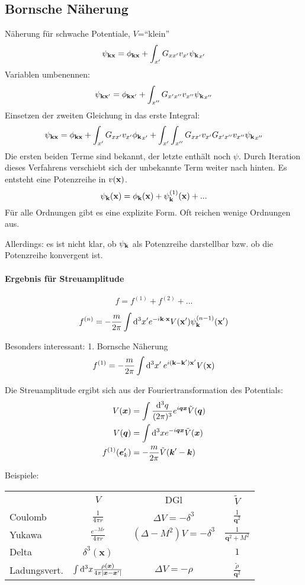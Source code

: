 \documentclass[11pt,a4paper]{report}
\renewcommand{\vec}{\boldsymbol}
\begin{document}
\subsection{Bornsche Näherung}

Näherung für schwache Potentiale, $V$=``klein''
$$\psi_{\mathbf{k} \mathbf{x} }=\phi_{\mathbf{k}\mathbf{x}}+\int_{x'}G_{xx'}v_{x'}{\psi_{\mathbf{k}}}_{x'}$$
Variablen umbenennen:
$$\psi_{\mathbf{k} \mathbf{x}' }=\phi_{\mathbf{k}\mathbf{x}'}+\int_{x''}G_{x'x''}v_{x''}{\psi_{\mathbf{k}}}_{x''}$$
Einsetzen der zweiten Gleichung in das erste Integral:
$$\psi_{\mathbf{k} \mathbf{x} }=\phi_{\mathbf{k}\mathbf{x}} + \int_{x'}G_{xx'}v_{x'}{\phi_{\mathbf{k}}}_{x'} +\int_{x'}\int_{x''}G_{xx'}v_{x'}G_{x'x''}v_{x''}{\psi_{\mathbf{k}}}_{x''}$$
Die ersten beiden Terme sind bekannt, der letzte enthält noch $\psi$. Durch Iteration dieses Verfahrens verschiebt sich der unbekannte Term weiter nach hinten. Es entsteht eine Potenzreihe in $v(\mathbf{x} )$.
$$\psi_{\mathbf{k}} (\mathbf{x})=\phi_{\mathbf{k}} (\mathbf{x} )+\psi_{\mathbf{k}}^{(1)}(\mathbf{x} )+...$$
Für alle Ordnungen gibt es eine explizite Form. Oft reichen wenige Ordnungen aus.\par 
Allerdings: es ist nicht klar, ob $\psi_{\mathbf{k}}$ als Potenzreihe darstellbar bzw. ob die Potenzreihe konvergent ist.
\paragraph{Ergebnis für Streuamplitude}

$$f=f^{(1)}+f^{(2)}+...$$

$$f^{(n)}=-\frac{m}{2\pi}\int\mathrm{d}^3x'e^{-i\mathbf{k}\cdot\mathbf{x} } V(\mathbf{x}')\psi_{\mathbf{k}}^{(n-1)}(\mathbf{x}')$$

Besonders interessant: 1. Bornsche Näherung
$$f^{(1)}=-\frac{m}{2\pi}\int\mathrm{d}^3x'\:e^{i(\mathbf{k} -\mathbf{k}')\mathbf{x}'}V(\mathbf{x} )$$

Die Streuamplitude ergibt sich aus der Fouriertransformation des Potentials:
\begin{align*}
    V(\vec{x}) &= \int \frac{\dif^3 q}{(2\pi)^3} e^{i \vec{q} \vec{x}} \tilde{V}(\vec{q}) \\
    V(\vec{q}) &= \int \dif^3 x e^{-i \vec{q} \vec{x}} \tilde{V}(\vec{x}) \\
    f^{(1)}(\vec{e}_k') &= -\frac{m}{2 \pi} \tilde{V}(\vec{k}' - \vec{k}) 
\end{align*}

Beispiele:
\begin{table}[htb]
    \centering
    \begin{tabular}{lccc}
        & $V$ & DGl & $\tilde{V}$ \\
        Coulomb & $\frac{1}{4 \pi r}$ & $\Delta V = -\delta^3$ & $\frac{1}{\vec{q}^2}$ \\
        Yukawa & $\frac{e^{-M r}}{4 \pi r}$ & $(\Delta - M^2) V = -\delta^3$ & $\frac{1}{\vec{q}^2 + M^2}$ \\
        Delta & $\delta^3(\vec{x})$ &  & $1$ \\
        Ladungsvert. & $\int \dif^3 x \frac{\rho(\vec{x})}{4 \pi |\vec{x} - \vec{x}'|}$ & $\Delta V = - \rho$ & $\frac{\tilde{\rho}}{\vec{q}^2}$ \\
    \end{tabular}
\end{table}
\end{document}
